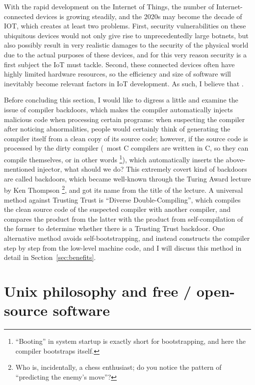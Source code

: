 With the rapid development on the Internet of Things, the number of
Internet-connected devices is growing steadily, and the 2020s may become
the decade of IOT, which creates at least two problems.  First, security
vulnerabilities on these ubiquitous devices would not only give rise to
unprecedentedly large botnets, but also possibly result in very realistic
damages to the security of the physical world due to the actual purposes of
these devices, and for this very reason security is a first subject the IoT must
tackle.  Second, these connected devices often have highly limited hardware
resources, so the efficiency and size of software will inevitably become
relevant factors in IoT development.  As such, I believe that .

Before concluding this section, I would like to digress a little and examine
the issue of compiler backdoors, which makes the compiler automatically injects
malicious code when processing certain programs: when suspecting the compiler
after noticing abnormalities, people would certainly think of generating the
compiler itself from a clean copy of its source code; however, if the source
code is processed by the dirty compiler (\eg~most C compilers are written in C,
so they can compile themselves, or in other words %
\footnote{``Booting'' in system startup is exactly short for bootstrapping,
and here the compiler bootstraps itself.}), which automatically inserts the
above-mentioned injector, what should we do?  This extremely covert kind of
backdoors are called  backdoors, which became well-known
through the Turing Award lecture by Ken Thompson%
\footnote{Who is, incidentally, a chess enthusiast; do you notice the
pattern of ``predicting the enemy's move''?}, and got its name from the
title of the lecture.  A universal method against Trusting Trust is ``Diverse
Double-Compiling'', which compiles the clean source code
of the suspected compiler with another compiler, and compares the product from
the latter with the product from self-compilation of the former to determine
whether there is a Trusting Trust backdoor.  One alternative method avoids
self-bootstrapping, and instead constructs the compiler step by step from
the low-level machine code, and I will
discuss this method in detail in Section~\ref{sec:benefits}.

\section{Unix philosophy and free / open-source software}\label{sec:foss}


